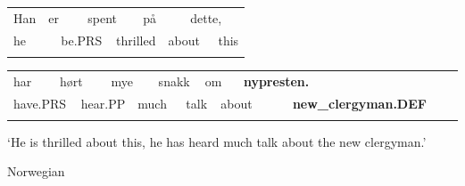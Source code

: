 \begin{tabular}{llllllllll}
\lsptoprule
Han & \multicolumn{2}{l}{er

} & \multicolumn{2}{l}{spent

} & \multicolumn{2}{l}{på

} & \multicolumn{2}{l}{dette,

} & \\
\multicolumn{2}{l}{he

} & \multicolumn{2}{l}{be.PRS

} & \multicolumn{2}{l}{thrilled

} & \multicolumn{2}{l}{about

} & \multicolumn{2}{l}{this

}\\
\lspbottomrule
\end{tabular}

\begin{tabular}{llllllllllllll}
\lsptoprule
har & \multicolumn{2}{l}{hørt

} & \multicolumn{2}{l}{mye

} & \multicolumn{2}{l}{snakk

} & \multicolumn{2}{l}{om

} & \multicolumn{2}{l}{{\bfseries nypresten.}

} & \multicolumn{2}{l}{} & \\
\multicolumn{2}{l}{have.PRS

} & \multicolumn{2}{l}{hear.PP

} & \multicolumn{2}{l}{much

} & \multicolumn{2}{l}{talk

} & \multicolumn{2}{l}{about 

} & \multicolumn{2}{l}{{\bfseries new\_clergyman.DEF}

} & \multicolumn{2}{l}{}\\
\lspbottomrule
\end{tabular}

\begin{styleTranslation}
‘He is thrilled about this, he has heard much talk about the new clergyman.’

\end{styleTranslation}

\begin{listWWNumileveli}
\item 

\begin{styleExample}
Norwegian 

\end{styleExample}

\end{listWWNumileveli}

